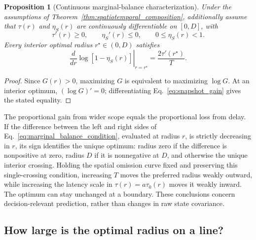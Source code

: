 \documentclass[11pt]{article}
\newtheorem{proposition}{Proposition}
\begin{document}
\begin{proposition}[Continuous marginal-balance characterization]
\label{thm:marginal_balance}
Under the assumptions of
Theorem~\ref{thm:spatiotemporal_composition}, additionally assume that
$\tau(r)$ and $\eta_S(r)$ are continuously differentiable on $[0,D]$, with
\[
    \tau'(r)\ge0,\qquad \eta_S'(r)\le0,\qquad 0\le\eta_S(r)<1.
\]
Every interior optimal radius $r^\star\in(0,D)$ satisfies
\begin{equation}
\left.\frac{d}{dr}\log[1-\eta_S(r)]\right|_{r=r^\star}
=\frac{2\tau'(r^\star)}{T}.
\label{eq:marginal_balance_condition}
\end{equation}
\end{proposition}

\begin{proof}
Since $G(r)>0$, maximizing $G$ is equivalent to maximizing $\log G$.
At an interior optimum, $(\log G)'=0$; differentiating
Eq.~\eqref{eq:snapshot_gain} gives the stated equality.
\end{proof}

The proportional gain from wider scope equals the proportional loss from
delay. If the difference between the left and right sides of
Eq.~\eqref{eq:marginal_balance_condition}, evaluated at radius $r$, is
strictly decreasing in $r$, its sign identifies the unique optimum:
radius zero if the difference is nonpositive at zero, radius $D$ if it is
nonnegative at $D$, and otherwise the unique interior crossing.
Holding the spatial omission curve fixed and preserving this single-crossing
condition, increasing $T$ moves the preferred radius weakly outward, while
increasing the latency scale in $\tau(r)=a\tau_0(r)$ moves it weakly inward.
The optimum can stay unchanged at a boundary. These conclusions concern
decision-relevant prediction, rather than changes in raw state covariance.

\subsection{How large is the optimal radius on a line?}
\label{subsec:canonical_line_model}
\end{document}
